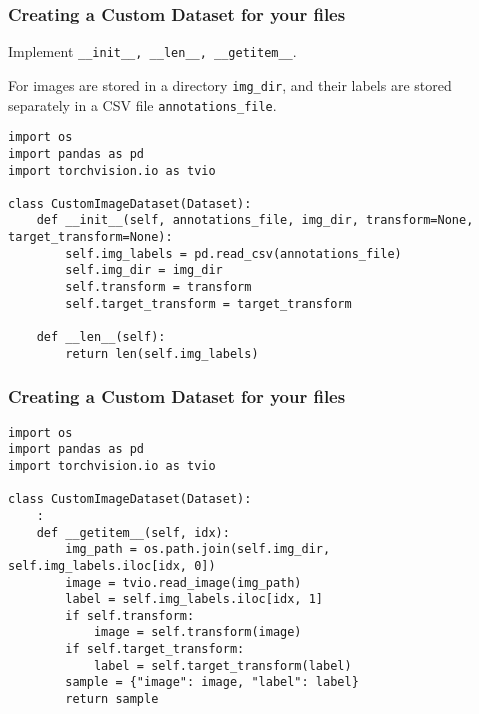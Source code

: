 \begin{frame}[fragile]
\frametitle{Creating a Custom Dataset for your files}

Implement \lstinline|__init__, __len__, __getitem__|.

For images are stored in a directory \lstinline|img_dir|, and their labels are stored separately in a CSV file \lstinline|annotations_file|.

\begin{lstlisting}
import os
import pandas as pd
import torchvision.io as tvio

class CustomImageDataset(Dataset):
    def __init__(self, annotations_file, img_dir, transform=None, target_transform=None):
        self.img_labels = pd.read_csv(annotations_file)
        self.img_dir = img_dir
        self.transform = transform
        self.target_transform = target_transform

    def __len__(self):
        return len(self.img_labels)

\end{lstlisting}

\end{frame} 

\begin{frame}[fragile]
\frametitle{Creating a Custom Dataset for your files}

\begin{lstlisting}
import os
import pandas as pd
import torchvision.io as tvio

class CustomImageDataset(Dataset):
    :
    def __getitem__(self, idx):
        img_path = os.path.join(self.img_dir, self.img_labels.iloc[idx, 0])
        image = tvio.read_image(img_path)
        label = self.img_labels.iloc[idx, 1]
        if self.transform:
            image = self.transform(image)
        if self.target_transform:
            label = self.target_transform(label)
        sample = {"image": image, "label": label}
        return sample
\end{lstlisting}

\end{frame} 




